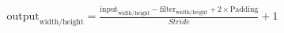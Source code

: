 \documentclass[preview]{standalone}
\begin{document}
\begin{align*}
\text{output}_{\text{width}/\text{height}} = \frac{\text{input}_{\text{width}/\text{height}} - \text{filter}_{\text{width}/\text{height}} + 2\times \text{Padding}}{Stride} + 1
\end{align*}
\end{document}

